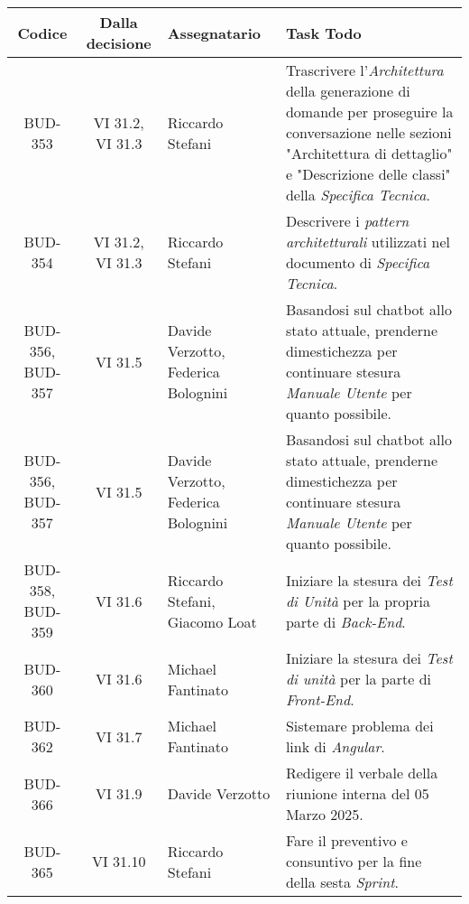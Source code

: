 \begin{table}[htbp]
\centering
{}
\begin{tabular}{|c|c|p{}|p{}|}
    \hline
    \rowcolor[gray]{0.75}
    \textbf{Codice} & \textbf{Dalla decisione} & \textbf{Assegnatario} & \textbf{Task Todo} \\
    \hline
    BUD-353 & VI 31.2, VI 31.3 & Riccardo Stefani & Trascrivere l'\emph{Architettura} della generazione di domande per proseguire la conversazione nelle sezioni "Architettura di dettaglio" e "Descrizione delle classi" della \emph{Specifica Tecnica}. \\
    \hline
    BUD-354 & VI 31.2, VI 31.3 & Riccardo Stefani & Descrivere i \emph{pattern architetturali} utilizzati nel documento di \emph{Specifica Tecnica}.\\
    \hline
    BUD-356, BUD-357 & VI 31.5 & Davide Verzotto, Federica Bolognini & Basandosi sul chatbot allo stato attuale, prenderne dimestichezza per continuare stesura \emph{Manuale Utente} per quanto possibile. \\ 
    \hline
    BUD-356, BUD-357 & VI 31.5 & Davide Verzotto, Federica Bolognini & Basandosi sul chatbot allo stato attuale, prenderne dimestichezza per continuare stesura \emph{Manuale Utente} per quanto possibile. \\ 
    \hline
    BUD-358, BUD-359 & VI 31.6 & Riccardo Stefani, Giacomo Loat & Iniziare la stesura dei \emph{Test di Unità} per la propria parte di \emph{Back-End}. \\
    \hline
    BUD-360 & VI 31.6 & Michael Fantinato & Iniziare la stesura dei \emph{Test di unità} per la parte di \emph{Front-End}. \\
    \hline
    BUD-362 & VI 31.7 & Michael Fantinato & Sistemare problema dei link di \emph{Angular}. \\
    \hline
    BUD-366 & VI 31.9 & Davide Verzotto & Redigere il verbale della riunione interna del 05 Marzo 2025. \\
    \hline
    BUD-365 & VI 31.10 & Riccardo Stefani & Fare il preventivo e consuntivo per la fine della sesta \emph{Sprint}. \\
    \hline

\end{tabular}
\end{table}